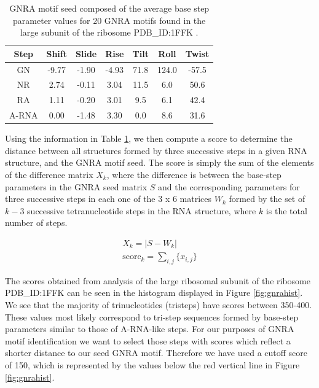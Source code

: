 \begin{table}[hb]  
\begin{center}
\begin{tabular}{|c|c|c|c|c|c|c|}
\hline
Step & Shift & Slide & Rise & Tilt & Roll & Twist \\
\hline
GN & -9.77 & -1.90 & -4.93 & 71.8 & 124.0 & -57.5 \\
NR & 2.74 & -0.11 & 3.04 & 11.5 & 6.0 & 50.6 \\
RA & 1.11 & -0.20 & 3.01 & 9.5 & 6.1 & 42.4 \\ \hline
A-RNA & 0.00 & -1.48 & 3.30 & 0.0 & 8.6 & 31.6\\
\hline
\end{tabular}
\caption{GNRA motif  seed composed of the average  base step parameter
  values for 20 GNRA motifs found in the large subunit of the ribosome
  PDB\_ID:1FFK \cite{lemieux2006}.}
\label{tab:seed}
\end{center}
\end{table}

Using the information in Table \ref{tab:seed}, we then compute a score
to  determine the  distance  between all  structures  formed by  three
successive  steps  in  a  given  RNA structure,  and  the  GNRA  motif
seed. The  score is simply the  sum of the elements  of the difference
matrix  $X_{k}$,  where  the   difference  is  between  the  base-step
parameters  in  the  GNRA   seed  matrix  $S$  and  the  corresponding
parameters  for three  successive  steps in  each  one of  the  3 x  6
matrices $W_{k}$ formed by the set of $k-3$ successive tetranucleotide
steps in the RNA structure, where  $k$ is the total number of steps.

\begin{gather}
X_{k} = |S - W_{k}| \\
\text{score}_{k} = \sum_{i,j} \{x_{i,j}\} 
\label{eq:sumdiffscore}
\end{gather}  

The scores  obtained from analysis  of the large ribosomal  subunit of
the ribosome  PDB\_ID:1FFK can be  seen in the histogram  displayed in
Figure \ref{fig:gnrahist}. We see  that the majority of trinucleotides
(tristeps)  have scores  between  350-400.  These  values most  likely
correspond  to  tri-step  sequences  formed  by  base-step  parameters
similar to those of A-RNA-like  steps.  For our purposes of GNRA motif
identification we want to select those steps with scores which reflect
a shorter distance  to our seed GNRA motif.  Therefore  we have used a
cutoff score of 150, which is  represented by the values below the red
vertical line in Figure \ref{fig:gnrahist}.

